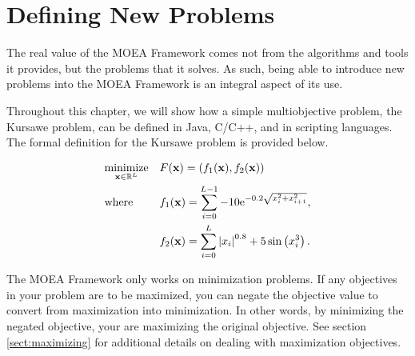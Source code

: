 %
%

\chapter{Defining New Problems}
\label{chpt:problems}

The real value of the MOEA Framework comes not from the algorithms and tools it provides, but the problems that it solves.  As such, being able to introduce new problems into the MOEA Framework is an integral aspect of its use.

Throughout this chapter, we will show how a simple multiobjective problem, the Kursawe problem, can be defined in Java, C/C++, and in scripting languages.  The formal definition for the Kursawe problem is provided below.

\begin{equation}
  \label{eq:mop}
  \begin{aligned}
    & \underset{\mathbf{x} \in \mathbb{R}^L}{\text{minimize}}
      & & F(\mathbf{x}) = (f_1(\mathbf{x}), f_2(\mathbf{x})) \\
    & \text{where}
      & & f_1(\mathbf{x}) = \sum_{i=0}^{L-1} -10\text{e}^{-0.2\sqrt{x_i^2 + x_{i+1}^2}}, \\
    & & & f_2(\mathbf{x}) = \sum_{i=0}^{L} \left|x_i\right|^{0.8} + 5\sin\left(x_i^3\right).
  \end{aligned}
\end{equation}

\begin{important}
The MOEA Framework only works on minimization problems.  If any objectives in your problem are to be maximized, you can negate the objective value to convert from maximization into minimization.  In other words, by minimizing the negated objective, your are maximizing the original objective.  See section \ref{sect:maximizing} for additional details on dealing with maximization objectives.
\end{important}

